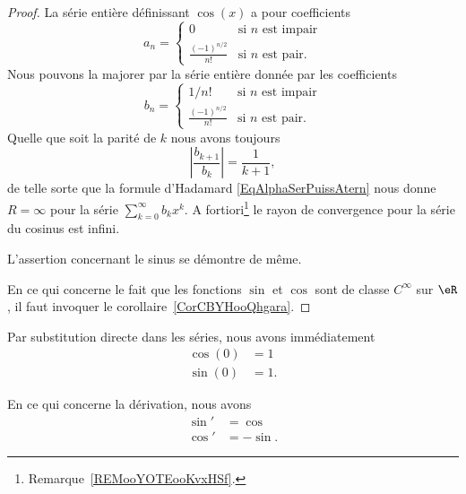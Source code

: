 \begin{proof}
    La série entière définissant \( \cos(x)\) a pour coefficients
    \begin{equation}
        a_n=\begin{cases}
            0    &   \text{si } n\text{ est impair}\\
            \frac{ (-1)^{n/2} }{ n! }    &   \text{si } n\text{ est pair}.
        \end{cases}
    \end{equation}
    Nous pouvons la majorer par la série entière donnée par les coefficients
    \begin{equation}
        b_n=\begin{cases}
            1/n!    &   \text{si } n\text{ est impair}\\
            \frac{ (-1)^{n/2} }{ n! }    &   \text{si } n\text{ est pair}.
        \end{cases}
    \end{equation}
    Quelle que soit la parité de \( k\) nous avons toujours
    \begin{equation}
        | \frac{ b_{k+1} }{ b_k } |=\frac{1}{ k+1 },
    \end{equation}
    de telle sorte que la formule d'Hadamard \eqref{EqAlphaSerPuissAtern} nous donne \( R=\infty\) pour la série \( \sum_{k=0}^{\infty}b_kx^k\). A fortiori\footnote{Remarque~\ref{REMooYOTEooKvxHSf}.} le rayon de convergence pour la série du cosinus est infini.

    L'assertion concernant le sinus se démontre de même.

    En ce qui concerne le fait que les fonctions \( \sin\) et \( \cos\) sont de classe \(  C^{\infty}\) sur \( \eR\), il faut invoquer le corollaire~\ref{CorCBYHooQhgara}.
\end{proof}

Par substitution directe dans les séries, nous avons immédiatement
\begin{subequations}        \label{SUBEQooTTNNooXzApSM}
    \begin{align}
        \cos(0)&=1\\
        \sin(0)&=1.
    \end{align}
\end{subequations}

\begin{lemma}       \label{LEMooBBCAooHLWmno}
    En ce qui concerne la dérivation, nous avons
    \begin{subequations}
        \begin{align}
            \sin'&=\cos\\
            \cos'&=-\sin.
        \end{align}
    \end{subequations}
\end{lemma}

